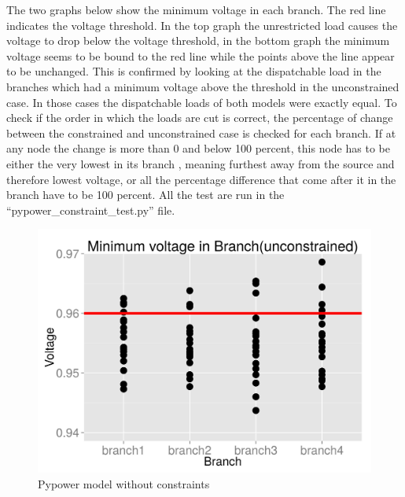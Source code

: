\documentclass[a4paper]{article}
\begin{document}
The two graphs below show the minimum voltage in each branch. The red line indicates the voltage threshold.  In the
top graph the unrestricted load causes the voltage to drop below the voltage threshold, in the bottom graph 
the minimum voltage seems to be bound to the red line while the points above the line appear to be unchanged. 
This is confirmed by looking at the dispatchable load in the branches which had a minimum voltage above the threshold
in the unconstrained case. In those cases the dispatchable loads of both models were exactly equal. To check if the order
in which the loads are cut is correct, the percentage of change between the constrained and unconstrained case is checked
for each branch. If  at any node the change is more than 0 and below 100 percent, this node has to be either the very 
lowest in its branch , meaning furthest away from the source and therefore lowest voltage, or all the percentage difference 
that come after it in the branch have to be 100 percent. 
All the test are run in the “pypower\_constraint\_test.py” file. 


\begin{figure}[!ht]
\includegraphics[width =\textwidth]{unconstrained.jpg}
\caption{Pypower model without constraints}
\label{un_constrained_pypower}
\end{figure}
\end{document}
